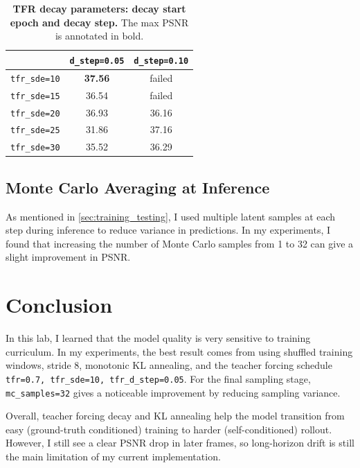 \documentclass[10pt,twocolumn,letterpaper]{article}
\begin{document}
\begin{table}[H]
  \centering
  \begin{tabular}{ccc}
    \toprule
     & \verb|d_step=0.05| & \verb|d_step=0.10| \\
    \midrule
    \verb|tfr_sde=10| & \textbf{37.56} & failed \\
    \verb|tfr_sde=15| & 36.54 & failed \\
    \verb|tfr_sde=20| & 36.93 & 36.16 \\
    \verb|tfr_sde=25| & 31.86 & 37.16 \\
    \verb|tfr_sde=30| & 35.52 & 36.29 \\
    \bottomrule
  \end{tabular}
  \caption{\textbf{TFR decay parameters: decay start epoch and decay step.}
    The max PSNR is annotated in bold.}
  \label{tab:tfr_analysis}
\end{table}

\subsection*{Monte Carlo Averaging at Inference}

As mentioned in \cref{sec:training_testing}, I used multiple latent samples
at each step during inference to reduce variance in predictions. In my
experiments, I found that increasing the number of Monte Carlo samples from
1 to 32 can give a slight improvement in PSNR.

\section{Conclusion}

In this lab, I learned that the model quality is very sensitive to training
curriculum. In my experiments, the best result comes from using shuffled
training windows, stride 8, monotonic KL annealing, and the teacher forcing
schedule \verb|tfr=0.7, tfr_sde=10, tfr_d_step=0.05|. For the final
sampling stage, \verb|mc_samples=32| gives a noticeable improvement by
reducing sampling variance.

Overall, teacher forcing decay and KL annealing help the model transition from
easy (ground-truth conditioned) training to harder (self-conditioned) rollout.
However, I still see a clear PSNR drop in later frames, so long-horizon drift is
still the main limitation of my current implementation.

% 
% 
\end{document}
